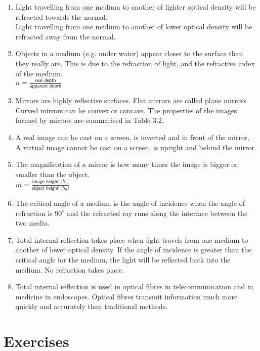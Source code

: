 \begin{enumerate}
\item Light travelling from one medium to another of lighter optical density will be refracted towards the normal. \\Light travelling from one medium to another of lower optical density will be refracted away from the normal.

\item Objects in a medium (e.g. under water) appear closer to the surface than they really are. This is due to the refraction of light, and the refractive index of the medium.\\$n = \frac{\textsf{real depth}}{\textsf{apparent depth}}$

\item Mirrors are highly reflective surfaces. Flat mirrors are called plane mirrors. Curved mirrors can be convex or concave. The properties of the images formed by mirrors are summarised in Table 3.2.

\item A real image can be cast on a screen, is inverted and in front of the mirror.\\
A virtual image cannot be cast on a screen, is upright and behind the mirror.

\item The magnification of a mirror is how many times the image is bigger or smaller than the object. \\$m= \frac{\textsf{image height ($h_i$)}}{\textsf{object height ($h_0$)}}$

\item The critical angle of a medium is the angle of incidence when the angle of refraction is $90^{\circ}$ and the refracted ray runs along the interface between the two media.

\item Total internal reflection takes place when light travels from one medium to another of lower optical density. If the angle of incidence is greater than the critical angle for the medium, the light will be reflected back into the medium. No refraction takes place.

\item Total internal reflection is used in optical fibres in telecommunication and in medicine in endoscopes. Optical fibres transmit information much more quickly and accurately than traditional methods.


\end{enumerate}

\section{Exercises}

